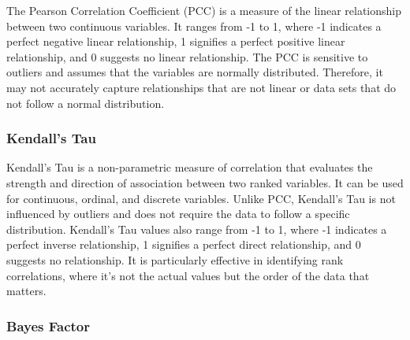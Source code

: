 The Pearson Correlation Coefficient (PCC) is a measure of the linear
relationship between two continuous variables. It ranges from -1 to 1, where -1
indicates a perfect negative linear relationship, 1 signifies a perfect
positive linear relationship, and 0 suggests no linear relationship. The PCC is
sensitive to outliers and assumes that the variables are normally distributed.
Therefore, it may not accurately capture relationships that are not linear or
data sets that do not follow a normal distribution.

\subsubsection{Kendall's Tau}

Kendall's Tau is a non-parametric measure of correlation that evaluates the strength and direction of association between two ranked variables. It can be used for continuous, ordinal, and discrete variables. Unlike PCC, Kendall's Tau is not influenced by outliers and does not require the data to follow a specific distribution. Kendall's Tau values also range from -1 to 1, where -1 indicates a perfect inverse relationship, 1 signifies a perfect direct relationship, and 0 suggests no relationship. It is particularly effective in identifying rank correlations, where it's not the actual values but the order of the data that matters.

\subsubsection{Bayes Factor}

